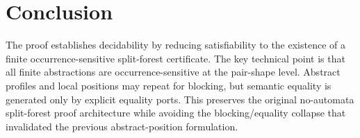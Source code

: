 \documentclass[11pt]{article}
\begin{document}
\section{Conclusion}

The proof establishes decidability by reducing satisfiability to the existence of a finite occurrence-sensitive split-forest certificate.  The key technical point is that all finite abstractions are occurrence-sensitive at the pair-shape level.  Abstract profiles and local positions may repeat for blocking, but semantic equality is generated only by explicit equality ports.  This preserves the original no-automata split-forest proof architecture while avoiding the blocking/equality collapse that invalidated the previous abstract-position formulation.
\end{document}
